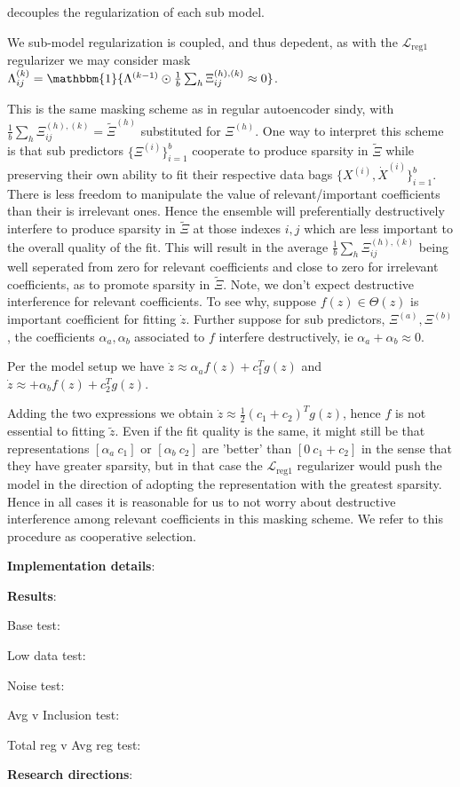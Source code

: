 \documentclass[11pt]{article}
\newcommand{\bs}{{\bigskip}}
\newcommand{\indi}{\mathbbm{1}}
\newcommand{\tb}{\textbf}
\begin{document}
  decouples the regularization of each sub model.  
  
We sub-model regularization is coupled,  and thus depedent,  as with the $ \mathcal{L}_\text{reg1}$ regularizer we may consider 
mask
$\Lambda ^{(k)}_{ij} = \indi\{\Lambda ^{(k-1)} \odot \frac{1}{b}\sum_{h} 
\Xi^{(h),(k)}_{ij} \approx 0\}$.

This is the same masking scheme as in regular autoencoder sindy,  with 
$\frac{1}{b}\sum_{h} \Xi^{(h),(k)}_{ij} = \tilde{\Xi}^{(h)}$ substituted for $\Xi^{(h)}$.  One way to interpret this scheme is that sub predictors
$\{\Xi^{(i)}\}_{i=1}^{b}$ cooperate to produce sparsity in $\tilde{\Xi}$ while preserving their own ability to fit their respective data bags 
$\{X^{(i)}, \dot{X}^{(i)}\}_{i=1}^{b}$.  There is less freedom to manipulate the value of relevant/important coefficients than their is irrelevant ones.  Hence the ensemble will preferentially destructively interfere to produce sparsity in $\tilde{\Xi}$ at those indexes $i,j$ which are less important to the overall quality of the fit.  This will result in the average $\frac{1}{b}\sum_{h} \Xi^{(h),(k)}_{ij}$ being well seperated from zero for relevant coefficients and close to zero for irrelevant coefficients, as to promote sparsity in $\tilde{\Xi}$.    Note,  we don't expect destructive interference for relevant coefficients.  To see why,  suppose $f(z) \in \Theta(z) $ is important coefficient for fitting $\dot{z}$.   Further suppose for sub predictors,  $\Xi^{(a)}, \Xi^{(b)}$,  the coefficients $\alpha_a,  \alpha_b$ associated to $f$ interfere destructively,  ie $\alpha_a +  \alpha_b \approx 0$.  

Per the model setup we have
$\dot{z} \approx \alpha_a f(z) + c_1^Tg(z)$ and 
$\dot{z} \approx + \alpha_b f(z) +  c_2^Tg(z)$.  

Adding the two expressions we obtain $\dot{z}   \approx \frac{1}{2}(c_1+c_2)^Tg(z)$,  hence $f$ is not essential to fitting $\tilde{z}$.    Even if the fit quality is the same,  it might still be that representations $[\alpha_a \: c_1]$ or $[\alpha_b \: c_2]$ are 'better' than $[0 \: c_1 + c_2]$ in the sense that they have  greater sparsity, but in that case the $\mathcal{L}_\text{reg1}$ regularizer would push the model in the direction of adopting the representation with the greatest sparsity.   Hence in all cases it is reasonable for us to not worry about destructive interference among relevant coefficients in this masking scheme. We refer to this procedure as cooperative selection.
  
  \pagebreak
  
  \tb{Implementation details}:

  
 \pagebreak
 
  
 \tb{Results}:
 
 Base test:
 
 \bs
 
 Low data test:
 
 
  \bs
 
 Noise test:
 
 
  \bs
 
 Avg v Inclusion test:
 
 
  \bs
 
 Total reg v Avg reg test:
 
  \bs
 
 \pagebreak
 
 
 \tb{Research directions}:
  
  
  
  \pagebreak
  
\end{document}
